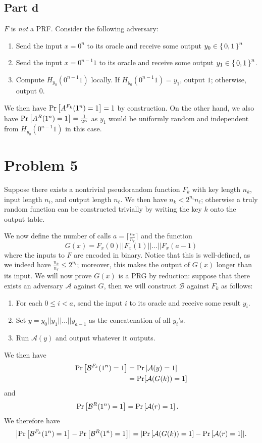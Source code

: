\documentclass{article}
\theoremstyle{definition}
\begin{document}
\subsection*{Part d}

$F$ is \emph{not} a PRF.
Consider the following adversary:
\begin{enumerate}
    \item Send the input $x=0^n$ to its oracle and receive some output $y_0\in\set{0, 1}^n$
    \item Send the input $x=0^{n-1}1$ to its oracle and receive some output $y_1\in\set{0, 1}^n$.
    \item Compute $H_{y_0}(0^{n-1}1)$ locally.
    If $H_{y_0}(0^{n-1}1)=y_1$, output $1$;
    otherwise, output $0$.
\end{enumerate}
We then have
$\Pr\left[A^{F_k}(1^n)=1\right]=1$
by construction.
On the other hand, we also have
$\Pr\left[A^{R}(1^n)=1\right]=\frac{1}{2^n}$ as $y_1$ would be uniformly random and independent from $H_{y_0}(0^{n-1}1)$ in this case.

\section*{Problem 5}

Suppose there exists a nontrivial pseudorandom function $F_k$ with key length $n_k$, input length $n_i$, and output length $n_\ell$.
We then have
$n_k < 2^{n_i} n_\ell$;
otherwise a truly random function can be constructed trivially by writing the key $k$ onto the output table.

We now define the number of calls $a = \lceil\frac{n_k}{n_\ell}\rceil$ and the function $$G(x)= F_x(0)||F_x(1)||\ldots ||F_x(a - 1)$$
where the inputs to $F$ are encoded in binary.
Notice that this is well-defined, as we indeed have $\frac{n_k}{n_\ell}\leq 2^{n_i}$;
moreover, this makes the output of $G(x)$ longer than its input.
We will now prove $G(x)$ is a PRG by reduction:
suppose that there exists an adversary $\mathcal{A}$ against $G$, then we will construct $\mathcal{B}$ against $F_k$ as follows:
\begin{enumerate}
    \item For each $0\leq i < a$, send the input $i$ to its oracle and receive some result $y_i$.
    \item Set $y=y_0 || y_1 || \ldots || y_{a-1}$ as the concatenation of all $y_i$'s.
    \item Run $\mathcal{A}(y)$ and output whatever it outputs.
\end{enumerate}
We then have
\begin{align*}
   \Pr\left[\mathcal{B}^{F_k}(1^n)=1\right]&=\Pr\left[\mathcal{A}(y)=1\right] \\
   &=\Pr[\mathcal{A}(G(k))=1]
\end{align*}
and
\begin{align*}
    \Pr\left[\mathcal{B}^R(1^n)=1\right] &= \Pr\left[\mathcal{A}(r)=1\right].
\end{align*}
We therefore have
$$\abs{\Pr\left[\mathcal{B}^{F_k}(1^n)=1\right] - \Pr\left[\mathcal{B}^R(1^n)=1\right]} =
\abs{\Pr\left[\mathcal{A}(G(k))=1\right] - \Pr\left[\mathcal{A}(r)=1\right]}.$$
\end{document}
